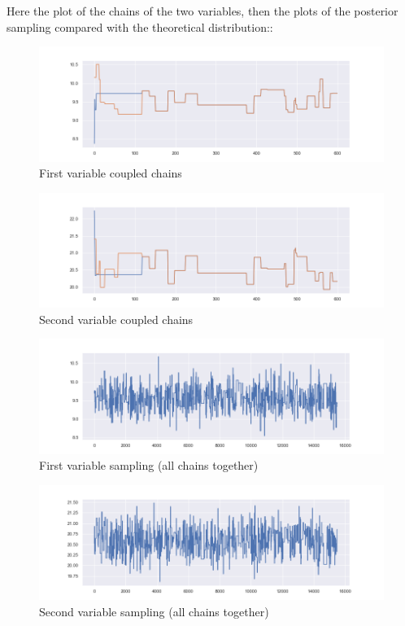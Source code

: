 \documentclass[11pt,a4paper,oneside]{report}
\begin{document}
Here the plot of the chains of the two variables, then the plots of the posterior sampling compared with the theoretical distribution::
\begin{figure}[h!]
	\centering
	\includegraphics[width=\textwidth]{immagini_abc_coupling_multivariate/coupling_abc_mult_chain_meeeting_1}	
	\caption{First variable coupled chains}
\end{figure}
\begin{figure}[h!]
	\centering
	\includegraphics[width=\textwidth]{immagini_abc_coupling_multivariate/coupling_abc_mult_chain_meeeting_2}	
	\caption{Second variable coupled chains}
\end{figure}

\begin{figure}[h!]
	\centering
	\includegraphics[width=\textwidth]{immagini_abc_coupling_multivariate/coupling_abc_mult_sampling_1}	
	\caption{First variable sampling (all chains together)}
\end{figure}
\begin{figure}[h!]
	\centering
	\includegraphics[width=\textwidth]{immagini_abc_coupling_multivariate/coupling_abc_mult_sampling_2}	
	\caption{Second variable sampling (all chains together)}
\end{figure}
\end{document}
